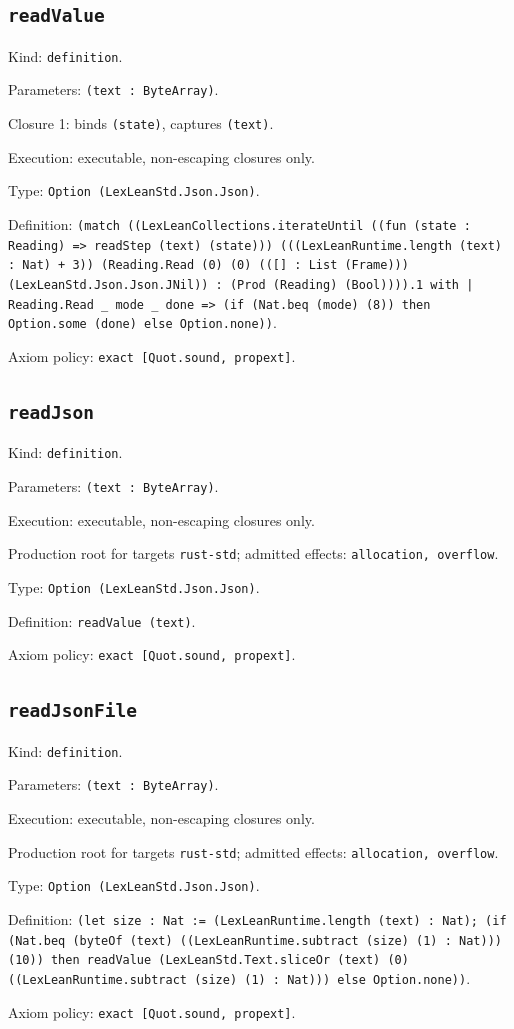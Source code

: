 \documentclass[11pt]{article}
\begin{document}
\subsection*{\texttt{readValue}}
\noindent Kind: \texttt{definition}.\par
\noindent Parameters: \texttt{(text : ByteArray)}.\par
\noindent Closure 1: binds \texttt{(state)}, captures \texttt{(text)}.\par
\noindent Execution: executable, non-escaping closures only.\par
\noindent Type: \texttt{Option (LexLeanStd.Json.Json)}.\par
\noindent Definition: \texttt{(match ((LexLeanCollections.iterateUntil ((fun (state : Reading) => readStep (text) (state))) (((LexLeanRuntime.length (text) : Nat) + 3)) (Reading.Read (0) (0) (([] : List (Frame))) (LexLeanStd.Json.Json.JNil)) : (Prod (Reading) (Bool)))).1 with | Reading.Read \_ mode \_ done => (if (Nat.beq (mode) (8)) then Option.some (done) else Option.none))}.\par
\noindent Axiom policy: \texttt{exact [Quot.sound, propext]}.\par
\subsection*{\texttt{readJson}}
\noindent Kind: \texttt{definition}.\par
\noindent Parameters: \texttt{(text : ByteArray)}.\par
\noindent Execution: executable, non-escaping closures only.\par
\noindent Production root for targets \texttt{rust-std}; admitted effects: \texttt{allocation, overflow}.\par
\noindent Type: \texttt{Option (LexLeanStd.Json.Json)}.\par
\noindent Definition: \texttt{readValue (text)}.\par
\noindent Axiom policy: \texttt{exact [Quot.sound, propext]}.\par
\subsection*{\texttt{readJsonFile}}
\noindent Kind: \texttt{definition}.\par
\noindent Parameters: \texttt{(text : ByteArray)}.\par
\noindent Execution: executable, non-escaping closures only.\par
\noindent Production root for targets \texttt{rust-std}; admitted effects: \texttt{allocation, overflow}.\par
\noindent Type: \texttt{Option (LexLeanStd.Json.Json)}.\par
\noindent Definition: \texttt{(let size : Nat := (LexLeanRuntime.length (text) : Nat); (if (Nat.beq (byteOf (text) ((LexLeanRuntime.subtract (size) (1) : Nat))) (10)) then readValue (LexLeanStd.Text.sliceOr (text) (0) ((LexLeanRuntime.subtract (size) (1) : Nat))) else Option.none))}.\par
\noindent Axiom policy: \texttt{exact [Quot.sound, propext]}.\par
\end{document}
